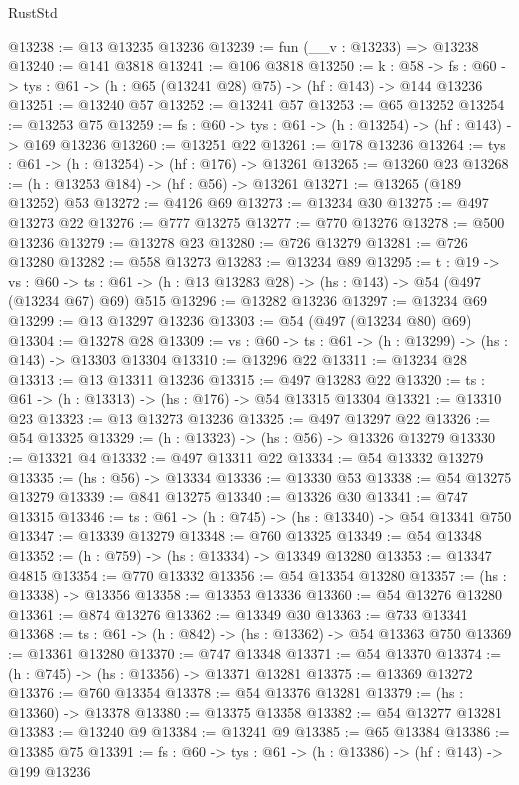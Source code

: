 \begin{lexlean}{RustStd}
\begin{coremodule}
@13238 := @13 @13235 @13236
@13239 := fun (__v : @13233) => @13238
@13240 := @141 @3818
@13241 := @106 @3818
@13250 := {k : @58} ->
  {fs : @60} -> {tys : @61} -> (h : @65 (@13241 @28) @75) -> (hf : @143) -> @144 @13236
@13251 := @13240 @57
@13252 := @13241 @57
@13253 := @65 @13252
@13254 := @13253 @75
@13259 := {fs : @60} -> {tys : @61} -> (h : @13254) -> (hf : @143) -> @169 @13236
@13260 := @13251 @22
@13261 := @178 @13236
@13264 := {tys : @61} -> (h : @13254) -> (hf : @176) -> @13261
@13265 := @13260 @23
@13268 := (h : @13253 @184) -> (hf : @56) -> @13261
@13271 := @13265 (@189 @13252) @53
@13272 := @4126 @69
@13273 := @13234 @30
@13275 := @497 @13273 @22
@13276 := @777 @13275
@13277 := @770 @13276
@13278 := @500 @13236
@13279 := @13278 @23
@13280 := @726 @13279
@13281 := @726 @13280
@13282 := @558 @13273
@13283 := @13234 @89
@13295 := {t : @19} ->
  {vs : @60} ->
  {ts : @61} -> (h : @13 @13283 @28) -> (hs : @143) -> @54 (@497 (@13234 @67) @69) @515
@13296 := @13282 @13236
@13297 := @13234 @69
@13299 := @13 @13297 @13236
@13303 := @54 (@497 (@13234 @80) @69)
@13304 := @13278 @28
@13309 := {vs : @60} -> {ts : @61} -> (h : @13299) -> (hs : @143) -> @13303 @13304
@13310 := @13296 @22
@13311 := @13234 @28
@13313 := @13 @13311 @13236
@13315 := @497 @13283 @22
@13320 := {ts : @61} -> (h : @13313) -> (hs : @176) -> @54 @13315 @13304
@13321 := @13310 @23
@13323 := @13 @13273 @13236
@13325 := @497 @13297 @22
@13326 := @54 @13325
@13329 := (h : @13323) -> (hs : @56) -> @13326 @13279
@13330 := @13321 @4
@13332 := @497 @13311 @22
@13334 := @54 @13332 @13279
@13335 := (hs : @56) -> @13334
@13336 := @13330 @53
@13338 := @54 @13275 @13279
@13339 := @841 @13275
@13340 := @13326 @30
@13341 := @747 @13315
@13346 := {ts : @61} -> (h : @745) -> (hs : @13340) -> @54 @13341 @750
@13347 := @13339 @13279
@13348 := @760 @13325
@13349 := @54 @13348
@13352 := (h : @759) -> (hs : @13334) -> @13349 @13280
@13353 := @13347 @4815
@13354 := @770 @13332
@13356 := @54 @13354 @13280
@13357 := (hs : @13338) -> @13356
@13358 := @13353 @13336
@13360 := @54 @13276 @13280
@13361 := @874 @13276
@13362 := @13349 @30
@13363 := @733 @13341
@13368 := {ts : @61} -> (h : @842) -> (hs : @13362) -> @54 @13363 @750
@13369 := @13361 @13280
@13370 := @747 @13348
@13371 := @54 @13370
@13374 := (h : @745) -> (hs : @13356) -> @13371 @13281
@13375 := @13369 @13272
@13376 := @760 @13354
@13378 := @54 @13376 @13281
@13379 := (hs : @13360) -> @13378
@13380 := @13375 @13358
@13382 := @54 @13277 @13281
@13383 := @13240 @9
@13384 := @13241 @9
@13385 := @65 @13384
@13386 := @13385 @75
@13391 := {fs : @60} -> {tys : @61} -> (h : @13386) -> (hf : @143) -> @199 @13236

\end{coremodule}
\end{lexlean}
